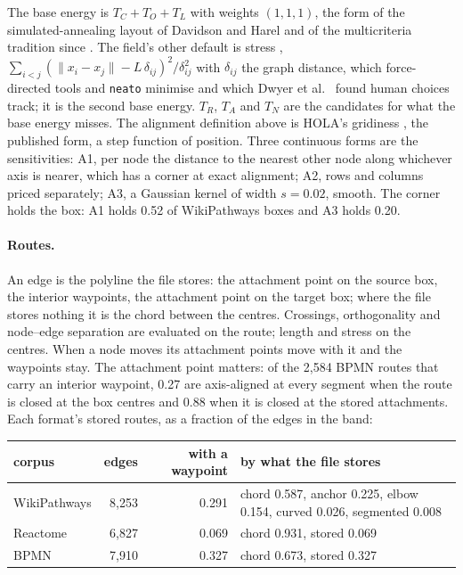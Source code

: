 \documentclass[11pt]{article}
\begin{document}
The base energy is $T_C + T_O + T_L$ with weights $(1,1,1)$, the form of the
simulated-annealing layout of Davidson and Harel \cite{dh96} and of the multicriteria
tradition since \cite{ahmed20}. The field's other default is stress \cite{kamada89,
gansner05}, $\sum_{i<j} (\|x_i - x_j\| - L\,\delta_{ij})^2 / \delta_{ij}^2$ with
$\delta_{ij}$ the graph distance, which force-directed tools and \texttt{neato} minimise
and which Dwyer et al.\ \cite{dwyer09} found human choices track; it is the second base
energy. $T_R$, $T_A$ and $T_N$ are the candidates for what the
base energy misses. The alignment definition above is HOLA's gridiness \cite{hola16}, the
published form, a step function of position. Three continuous forms are the sensitivities:
A1, per node the distance to the nearest other node along whichever axis is nearer, which
has a corner at exact alignment; A2, rows and columns priced separately; A3, a Gaussian
kernel of width $s = 0.02$, smooth. The corner holds the box: A1 holds 0.52 of
WikiPathways boxes and A3 holds 0.20.

\paragraph{Routes.} An edge is the polyline the file stores: the attachment point on the
source box, the interior waypoints, the attachment point on the target box; where the file
stores nothing it is the chord between the centres. Crossings, orthogonality and node--edge
separation are evaluated on the route; length and stress on the centres. When a node moves
its attachment points move with it and the waypoints stay. The attachment point matters:
of the 2{,}584 BPMN routes that carry an interior waypoint, 0.27 are axis-aligned at every
segment when the route is closed at the box centres and 0.88 when it is closed at the
stored attachments. Each format's stored routes, as a fraction of the edges in the band:

\begin{center}\scriptsize
\begin{tabular}{lrrl}
\toprule
corpus & edges & with a waypoint & by what the file stores \\
\midrule
WikiPathways & 8{,}253 & 0.291 & chord 0.587, anchor 0.225, elbow 0.154, curved 0.026, segmented 0.008 \\
Reactome & 6{,}827 & 0.069 & chord 0.931, stored 0.069 \\
BPMN & 7{,}910 & 0.327 & chord 0.673, stored 0.327 \\
\bottomrule
\end{tabular}
\end{center}
\end{document}
